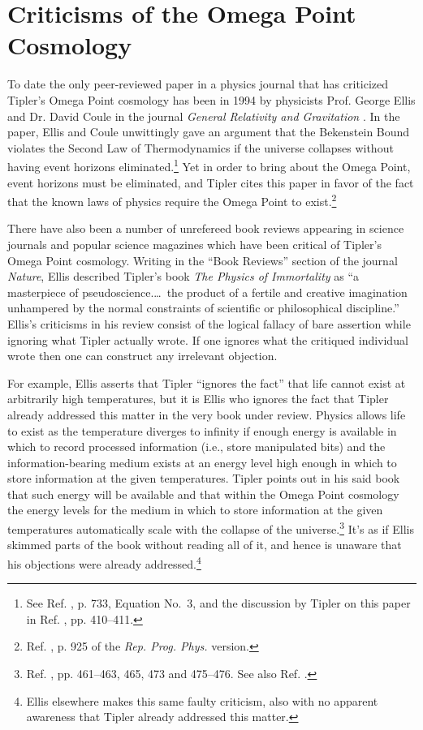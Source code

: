 \documentclass[letterpaper,12pt]{article}
\begin{document}
\section{Criticisms of the Omega Point Cosmology}
\label{sec:Criticisms}

To date the only peer-reviewed paper in a physics journal that has criticized Tipler's Omega Point cosmology has been in 1994 by physicists Prof. George Ellis and Dr. David Coule in the journal \emph{General Relativity and Gravitation} \cite{EllisCoule1994}. In the paper, Ellis and Coule unwittingly gave an argument that the Bekenstein Bound violates the Second Law of Thermodynamics if the universe collapses without having event horizons eliminated.\footnote{See Ref. , p. 733, Equation No.~3, and the discussion by Tipler on this paper in Ref. , pp. 410--411.} Yet in order to bring about the Omega Point, event horizons must be eliminated, and Tipler cites this paper in favor of the fact that the known laws of physics require the Omega Point to exist.\footnote{Ref. , p. 925 of the \emph{Rep. Prog. Phys.} version.}

There have also been a number of unrefereed book reviews appearing in science journals and popular science magazines which have been critical of Tipler's Omega Point cosmology. Writing in the ``Book Reviews'' section of the journal \emph{Nature}, Ellis \cite{Ellis1994} described Tipler's book \emph{The Physics of Immortality} as ``a masterpiece of pseudoscience.\thinspace\ldots\ the product of a fertile and creative imagination unhampered by the normal constraints of scientific or philosophical discipline.'' Ellis's criticisms in his review consist of the logical fallacy of bare assertion while ignoring what Tipler actually wrote. If one ignores what the critiqued individual wrote then one can construct any irrelevant objection.

For example, Ellis asserts that Tipler ``ignores the fact'' that life cannot exist at arbitrarily high temperatures, but it is Ellis who ignores the fact that Tipler already addressed this matter in the very book under review. Physics allows life to exist as the temperature diverges to infinity if enough energy is available in which to record processed information (i.e., store manipulated bits) and the information-bearing medium exists at an energy level high enough in which to store information at the given temperatures. Tipler points out in his said book that such energy will be available and that within the Omega Point cosmology the energy levels for the medium in which to store information at the given temperatures automatically scale with the collapse of the universe.\footnote{Ref. , pp. 461--463, 465, 473 and 475--476. See also Ref. .} It's as if Ellis skimmed parts of the book without reading all of it, and hence is unaware that his objections were already addressed.\footnote{Ellis elsewhere \cite{StoegerEllis1995} makes this same faulty criticism, also with no apparent awareness that Tipler already addressed this matter.}
\end{document}
